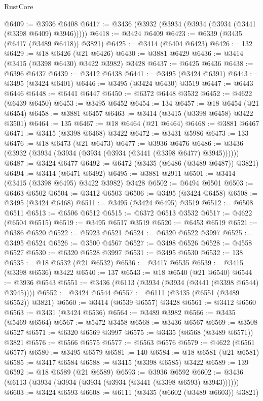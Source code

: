 \begin{lexlean}{RustCore}
\begin{coremodule}
@6409 := @3936 @6408
@6417 := @3436 (@3932 (@3934 (@3934 (@3934 (@3441 (@3398 @6409) @3946)))))
@6418 := @3424 @6409
@6423 := @6339 (@3435 (@6417 (@3489 @6418)) @3821)
@6425 := @3414 (@6404 @6423)
@6426 := 132
@6429 := @18 @6426 (@21 @6426)
@6430 := @3881 @6429
@6436 := @3414 (@3415 (@3398 @6430) @3422 @3982) @3428
@6437 := @6425 @6436
@6438 := @6396 @6437
@6439 := @3412 @6438
@6441 := @3495 (@3424 @6391)
@6443 := @3495 (@3424 @6401)
@6446 := @3495 (@3424 @6430) @3519
@6447 := @6443 @6446
@6448 := @6441 @6447
@6450 := @6372 @6448 @3532
@6452 := @4622 (@6439 @6450)
@6453 := @3495 @6452
@6454 := 134
@6457 := @18 @6454 (@21 @6454)
@6458 := @3881 @6457
@6463 := @3414 (@3415 (@3398 @6458) @3422 @3501)
@6464 := 135
@6467 := @18 @6464 (@21 @6464)
@6468 := @3881 @6467
@6471 := @3415 (@3398 @6468) @3422
@6472 := @3431 @5986
@6473 := 133
@6476 := @18 @6473 (@21 @6473)
@6477 := @3936 @6476
@6486 := @3436 (@3932 (@3934 (@3934 (@3934 (@3934 (@3441 (@3398 @6477) @3945))))))
@6487 := @3424 @6477
@6492 := @6472 (@3435 (@6486 (@3489 @6487)) @3821)
@6494 := @3414 (@6471 @6492)
@6495 := @3881 @2911
@6501 := @3414 (@3415 (@3398 @6495) @3422 @3982) @3428
@6502 := @6494 @6501
@6503 := @6463 @6502
@6504 := @3412 @6503
@6506 := @3495 (@3424 @6458)
@6508 := @3495 (@3424 @6468)
@6511 := @3495 (@3424 @6495) @3519
@6512 := @6508 @6511
@6513 := @6506 @6512
@6515 := @6372 @6513 @3532
@6517 := @4622 (@6504 @6515)
@6519 := @3495 @6517 @3519
@6520 := @6453 @6519
@6521 := @6386 @6520
@6522 := @5923 @6521
@6524 := @6320 @6522 @3997
@6525 := @3495 @6524
@6526 := @3500 @4567
@6527 := @3498 @6526
@6528 := @4558 @6527
@6530 := @6320 @6528 @3997
@6531 := @3495 @6530
@6532 := 138
@6535 := @18 @6532 (@21 @6532)
@6536 := @3417 @6535
@6539 := @3415 (@3398 @6536) @3422
@6540 := 137
@6543 := @18 @6540 (@21 @6540)
@6544 := @3936 @6543
@6551 := @3436 (@6113 (@3934 (@3934 (@3441 (@3398 @6544) @3945))))
@6552 := @3424 @6544
@6557 := @6111 (@3435 (@6551 (@3489 @6552)) @3821)
@6560 := @3414 (@6539 @6557) @3428
@6561 := @3412 @6560
@6563 := @3431 (@3424 @6536)
@6564 := @3489 @3982
@6566 := @3435 (@5469 @6564)
@6567 := @5472 @3458
@6568 := @3436 @6567
@6569 := @3508 @6527
@6571 := @6320 @6569 @3997
@6575 := @3435 (@6568 (@3489 @6571)) @3821
@6576 := @6566 @6575
@6577 := @6563 @6576
@6579 := @4622 (@6561 @6577)
@6580 := @3495 @6579
@6581 := 140
@6584 := @18 @6581 (@21 @6581)
@6585 := @3417 @6584
@6588 := @3415 (@3398 @6585) @3422
@6589 := 139
@6592 := @18 @6589 (@21 @6589)
@6593 := @3936 @6592
@6602 := @3436 (@6113 (@3934 (@3934 (@3934 (@3934 (@3441 (@3398 @6593) @3943))))))
@6603 := @3424 @6593
@6608 := @6111 (@3435 (@6602 (@3489 @6603)) @3821)

\end{coremodule}
\end{lexlean}
